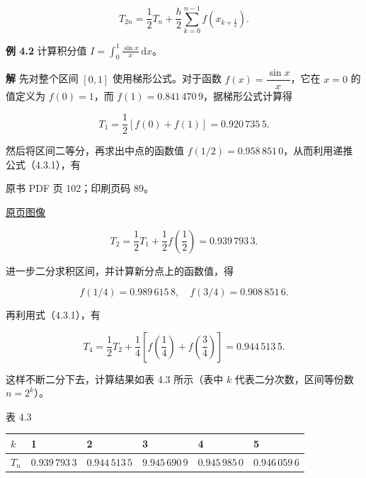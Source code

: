 \[
T_{2n}=\frac12T_n+\frac h2\sum_{k=0}^{n-1}f(x_{k+\frac12}).
\tag{4.3.1}
\]

\textbf{例 4.2} 计算积分值 \(I=\displaystyle\int_0^1\frac{\sin x}{x}\,\mathrm{d}x\)。

\textbf{解} 先对整个区间 \([0,1]\) 使用梯形公式。对于函数 \(f(x)=\dfrac{\sin x}{x}\)，它在 \(x=0\) 的值定义为 \(f(0)=1\)，而 \(f(1)=0.841\,470\,9\)，据梯形公式计算得

\[
T_1=\frac12[f(0)+f(1)]=0.920\,735\,5.
\]

然后将区间二等分，再求出中点的函数值 \(f(1/2)=0.958\,851\,0\)，从而利用递推公式（4.3.1），有

\clearpage

原书 PDF 页 102；印刷页码 89。

\href{source-images/pdf-102.jpeg}{原页图像}

\[
T_2=\frac12T_1+\frac12f\left(\frac12\right)=0.939\,793\,3.
\]

进一步二分求积区间，并计算新分点上的函数值，得

\[
f(1/4)=0.989\,615\,8,\quad f(3/4)=0.908\,851\,6.
\]

再利用式（4.3.1），有

\[
T_4=\frac12T_2+\frac14\left[f\left(\frac14\right)+f\left(\frac34\right)\right]=0.944\,513\,5.
\]

这样不断二分下去，计算结果如表 4.3 所示（表中 \(k\) 代表二分次数，区间等份数 \(n=2^k\)）。

表 4.3

{\def\LTcaptype{none} %
\begin{longtable}[]{@{}
  >{\raggedright\arraybackslash}p{}
  >{\raggedright\arraybackslash}p{}
  >{\raggedright\arraybackslash}p{}
  >{\raggedright\arraybackslash}p{}
  >{\raggedright\arraybackslash}p{}
  >{\raggedright\arraybackslash}p{}@{}}
\toprule\noalign{}
\begin{minipage}[b]{\linewidth}\raggedright
\(k\)
\end{minipage} & \begin{minipage}[b]{\linewidth}\raggedright
1
\end{minipage} & \begin{minipage}[b]{\linewidth}\raggedright
2
\end{minipage} & \begin{minipage}[b]{\linewidth}\raggedright
3
\end{minipage} & \begin{minipage}[b]{\linewidth}\raggedright
4
\end{minipage} & \begin{minipage}[b]{\linewidth}\raggedright
5
\end{minipage} \\
\midrule\noalign{}
\endhead
\bottomrule\noalign{}
\endlastfoot
\(T_n\) & \(0.939\,793\,3\) & \(0.944\,513\,5\) & \(9.945\,690\,9\) & \(0.945\,985\,0\) & \(0.946\,059\,6\) \\
\end{longtable}
}


